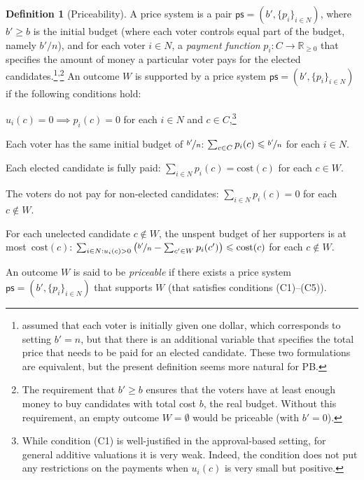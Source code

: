 \documentclass[10pt]{scrartcl}
\renewcommand*{\leq}{\leqslant}
\renewcommand*{\ge}{\geqslant}
\renewcommand*{\geq}{\geqslant}
\newcommand{\myemph}[1]{{\color{winered}\emph{#1}}}
\newcommand{\reals}{{{\mathbb{R}}}}
\newcommand{\cost}{{{\mathrm{cost}}}}
\theoremstyle{definition}
\newtheorem{definition}{Definition}
\theoremstyle{plain}
\renewenvironment{description}
{\list{}{\labelwidth=10pt \leftmargin=15pt
		\let\makelabel\descriptionlabel}}
{\endlist}
\begin{document}
\begin{definition}[Priceability]\label{def:priceability}
	A price system is a pair $\textsf{ps} = (b', \{p_i\}_{i \in N})$, where $b' \geq b$ is the initial budget (where each voter controls equal part of the budget, namely $b'/n$), and for each voter $i \in N$, a \myemph{payment function} $p_i\colon C \to \reals_{\ge 0}$ that specifies the amount of money a particular voter pays for the elected candidates.\footnote{\citet{pet-sko:laminar} assumed that each voter is initially given one dollar, which corresponds to setting $b' = n$, but that there is an additional variable that specifies the total price that needs to be paid for an elected candidate. These two formulations are equivalent, but the present definition seems more natural for PB.}\textsuperscript{,}\footnote{The requirement that $b' \geq b$ ensures that the voters have at least enough money to buy candidates with total cost $b$, the real budget. Without this requirement, an empty outcome $W = \emptyset$ would be priceable (with $b' = 0$).} An outcome $W$ is supported by a price system $\textsf{ps} = (b', \{p_i\}_{i \in N})$ if the following conditions hold:
	\begin{description}
		\item[(C1).] $u_i(c) = 0 \implies p_i(c) = 0$ for each $i \in N$ and $c \in C$,\footnote{While condition (C1) is well-justified in the approval-based setting, for general additive valuations it is very weak. Indeed, the condition does not put any restrictions on the payments when $u_i(c)$ is very small but positive.}
		
		\item[(C2).] Each voter has the same initial budget of $\nicefrac{b'}{n}$: $\sum_{c \in C} p_i(c) \leq \nicefrac{b'}{n}$ for each $i \in N$.
		
		\item[(C3).] Each elected candidate is fully paid: $\sum_{i \in N}p_i(c) = \cost(c)$ for each $c \in W$.
		
		\item[(C4).] The voters do not pay for non-elected candidates: $\sum_{i \in N}p_i(c) = 0$ for each $c \notin W$.
		
		\item[(C5).] For each unelected candidate $c\not\in W$, the unspent budget of her supporters is at most~$\cost(c)$: $\sum_{i \in N : u_i(c) > 0} \left(\nicefrac{b'}{n} - \sum_{c' \in W}p_i(c')\right) \leq \cost(c)$ for each $c \notin W$.
	\end{description}
	
	An outcome $W$ is said to be \myemph{priceable} if there exists a price system $\textsf{ps} = (b', \{p_i\}_{i \in N})$ that supports $W$ (that satisfies conditions (C1)--(C5)).
\end{definition}
\end{document}

